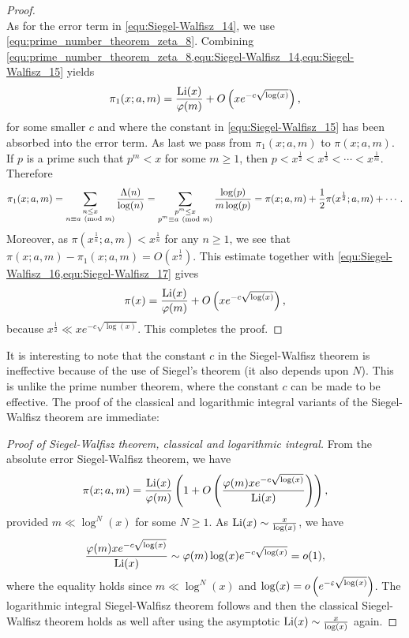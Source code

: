 \begin{proof}
\begin{equation}
      \end{equation}
      As for the error term in \cref{equ:Siegel-Walfisz_14}, we use \cref{equ:prime_number_theorem_zeta_8}. Combining \cref{equ:prime_number_theorem_zeta_8,equ:Siegel-Walfisz_14,equ:Siegel-Walfisz_15} yields
      \begin{equation}\label{equ:Siegel-Walfisz_16}
        \pi_{1}(x;a,m) = \frac{\operatorname{\mathrm{Li}}(x)}{\varphi(m)}+O\left(xe^{-c\sqrt{\log(x)}}\right),
      \end{equation}
      for some smaller $c$ and where the constant in \cref{equ:Siegel-Walfisz_15} has been absorbed into the error term. As last we pass from $\pi_{1}(x;a,m)$ to $\pi(x;a,m)$. If $p$ is a prime such that $p^{m} < x$ for some $m \ge 1$, then $p < x^{\frac{1}{2}} < x^{\frac{1}{3}} < \cdots < x^{\frac{1}{m}}$. Therefore
      \begin{equation}\label{equ:Siegel-Walfisz_17}
        \pi_{1}(x;a,m) = \sum_{\substack{n \le x \\ n \equiv a \ \left(\text{mod }m\right)}}\frac{\Lambda(n)}{\log(n)} = \sum_{\substack{p^{m} \le x \\ p^{m} \equiv a \ \left(\text{mod }m\right)}}\frac{\log(p)}{m\log(p)} = \pi(x;a,m)+\frac{1}{2}\pi(x^{\frac{1}{2}};a,m)+\cdots.
      \end{equation}
      Moreover, as $\pi(x^{\frac{1}{n}};a,m) < x^{\frac{1}{n}}$ for any $n \ge 1$, we see that $\pi(x;a,m)-\pi_{1}(x;a,m) = O(x^{\frac{1}{2}})$. This estimate together with \cref{equ:Siegel-Walfisz_16,equ:Siegel-Walfisz_17} gives
      \[
        \pi(x) = \frac{\operatorname{\mathrm{Li}}(x)}{\varphi(m)}+O\left(xe^{-c\sqrt{\log(x)}}\right),
      \]
      because $x^{\frac{1}{2}} \ll xe^{-c\sqrt{\log(x)}}$. This completes the proof.
    \end{proof}

    It is interesting to note that the constant $c$ in the Siegel-Walfisz theorem is ineffective because of the use of Siegel's theorem (it also depends upon $N$). This is unlike the prime number theorem, where the constant $c$ can be made to be effective. The proof of the classical and logarithmic integral variants of the Siegel-Walfisz theorem are immediate:

    \begin{proof}[Proof of Siegel-Walfisz theorem, classical and logarithmic integral]
      From the absolute error Siegel-Walfisz theorem, we have
      \[
        \pi(x;a,m) = \frac{\operatorname{\mathrm{Li}}(x)}{\varphi(m)}\left(1+O\left(\frac{\varphi(m)xe^{-c\sqrt{\log(x)}}}{\operatorname{\mathrm{Li}}(x)}\right)\right),
      \]
      provided $m \ll \log^{N}(x)$ for some $N \ge 1$. As $\operatorname{\mathrm{Li}}(x) \sim \frac{x}{\log(x)}$, we have
      \[
        \frac{\varphi(m)xe^{-c\sqrt{\log(x)}}}{\operatorname{\mathrm{Li}}(x)} \sim \varphi(m)\log(x)e^{-c\sqrt{\log(x)}} = o(1),
      \]
      where the equality holds since $m \ll \log^{N}(x)$ and $\log(x) = o\left(e^{-\varepsilon\sqrt{\log(x)}}\right)$. The logarithmic integral Siegel-Walfisz theorem follows and then the classical Siegel-Walfisz theorem holds as well after using the asymptotic $\operatorname{\mathrm{Li}}(x) \sim \frac{x}{\log(x)}$ again.
    \end{proof}
    
